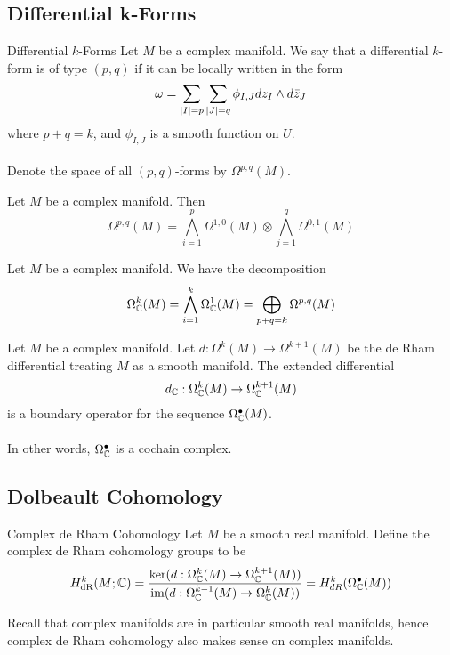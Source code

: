 \documentclass[a4paper]{article}
\begin{document}
\subsection{Differential k-Forms}
\begin{defn}{Differential $k$-Forms}{} Let $M$ be a complex manifold. We say that a differential $k$-form is of type $(p,q)$ if it can be locally written in the form $$\omega=\sum_{\abs{I}=p}\sum_{\abs{J}=q}\phi_{I,J}dz_I\wedge d\bar{z}_J$$ where $p+q=k$, and $\phi_{I,J}$ is a smooth function on $U$. \\~\\
Denote the space of all $(p,q)$-forms by $\Omega^{p,q}(M)$. 
\end{defn}

\begin{prp}{}{} Let $M$ be a complex manifold. Then $$\Omega^{p,q}(M)=\bigwedge_{i=1}^p\Omega^{1,0}(M)\otimes\bigwedge_{j=1}^q\Omega^{0,1}(M)$$
\end{prp}

\begin{lmm}{}{} Let $M$ be a complex manifold. We have the decomposition $$\Omega_{\mathbb{C}}^k(M)=\bigwedge_{i=1}^k\Omega_{\mathbb{C}}^1(M)=\bigoplus_{p+q=k}\Omega^{p,q}(M)$$
\end{lmm}

\begin{prp}{}{} Let $M$ be a complex manifold. Let $d:\Omega^k(M)\to\Omega^{k+1}(M)$ be the de Rham differential treating $M$ as a smooth manifold. The extended differential $$d_{\mathbb{C}}:\Omega_{\mathbb{C}}^k(M)\to\Omega_{\mathbb{C}}^{k+1}(M)$$ is a boundary operator for the sequence $\Omega_{\mathbb{C}}^\bullet(M)$. \\~\\
In other words, $\Omega_{\mathbb{C}}^\bullet$ is a cochain complex. 
\end{prp}

\subsection{Dolbeault Cohomology}
\begin{defn}{Complex de Rham Cohomology}{} Let $M$ be a smooth real manifold. Define the complex de Rham cohomology groups to be $$H_{\text{dR}}^k(M;\mathbb{C})=\frac{\ker(d:\Omega_{\mathbb{C}}^k(M)\to\Omega_{\mathbb{C}}^{k+1}(M))}{\operatorname{im}(d:\Omega_{\mathbb{C}}^{k-1}(M)\to\Omega_{\mathbb{C}}^k(M))}=H_{dR}^k(\Omega_{\mathbb{C}}^\bullet(M))$$
\end{defn}

Recall that complex manifolds are in particular smooth real manifolds, hence complex de Rham cohomology also makes sense on complex manifolds. 
\end{document}
